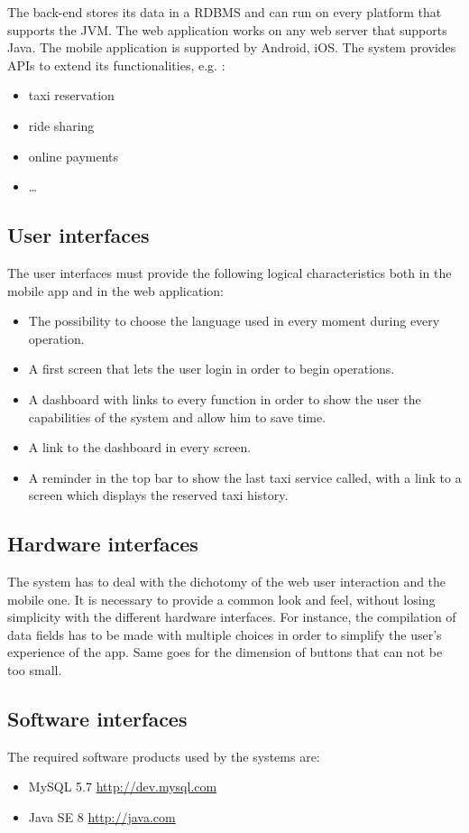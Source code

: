 The back-end stores its data in a RDBMS and  can run on every platform that supports the JVM.
The web application works on any web server that supports Java. The mobile application is supported by Android, iOS. The system provides APIs to extend its functionalities, e.g. :
\begin{itemize}
\item taxi reservation
\item ride sharing
\item online payments
\item \ldots
\end{itemize}


\subsection{User interfaces}
The user interfaces must provide the following logical characteristics both in the mobile app and in the web application:
\begin{itemize}
\item The possibility to choose the language used in every moment during every operation.
\item A first screen that lets the user login in order to begin operations.
\item A dashboard with links to every function in order to show the user the capabilities of the system and allow him to save time.
\item A link to the dashboard in every screen.
\item A reminder in the top bar to show the last taxi service called, with a link to a screen which displays the reserved taxi history.
\end{itemize}

\subsection{Hardware interfaces}
The system has to deal with the dichotomy of the web user interaction and the mobile one. It is necessary to provide a common look and feel, without losing simplicity with the different hardware interfaces. For instance, the compilation of data fields has to be made with multiple choices in order to simplify the user's experience of the app. Same goes for the dimension of buttons that can not be too small.

\subsection{Software interfaces}
The required software products used by the systems are:
\begin{itemize}
\item MySQL 5.7   \url{http://dev.mysql.com}
\item Java SE 8   \url{http://java.com}
\end{itemize}
